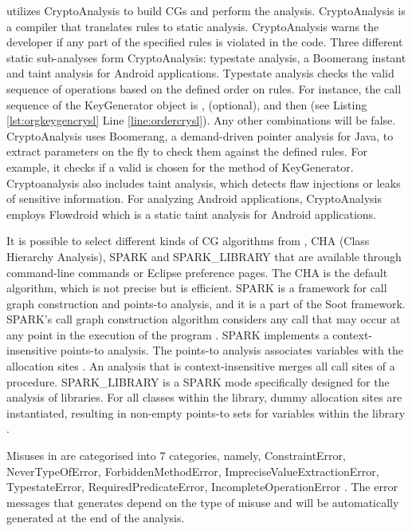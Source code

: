 \cognicryptsast{} utilizes CryptoAnalysis to build CGs and perform the analysis. CryptoAnalysis is a compiler that translates rules to static analysis. CryptoAnalysis warns the developer if any part of the specified \crysl{} rules is violated in the code. Three different static sub-analyses form CryptoAnalysis: typestate analysis, a Boomerang \cite{boomerang} instant and taint analysis for Android applications. Typestate analysis checks the valid sequence of operations based on the defined order on \crysl{} rules. For instance, the call sequence of the KeyGenerator object is ,  (optional), and then  (see Listing \ref{lst:orgkeygencrysl} Line \ref{line:ordercrysl}). Any other combinations will be false. CryptoAnalysis uses Boomerang, a demand-driven pointer analysis for Java, to extract parameters on the fly to check them against the defined \crysl{} rules. For example, it checks if a valid  is chosen for the  method of KeyGenerator.
Cryptoanalysis also includes taint analysis, which detects flaw injections or leaks of sensitive information. For analyzing Android applications, CryptoAnalysis employs Flowdroid \cite{flowdroid} which is a static taint analysis for Android applications.

It is possible to select different kinds of CG algorithms from \cognicryptsast, CHA (Class Hierarchy Analysis), SPARK \cite{spark} and SPARK\_LIBRARY that are available through command-line commands or Eclipse preference pages. The CHA is the default algorithm, which is not precise but is efficient. SPARK is a framework for call graph construction and points-to analysis, and it is a part of the Soot framework. SPARK's call graph construction algorithm considers any call that may occur at any point in the execution of the program \cite{soot}. SPARK implements a context-insensitive points-to analysis. The points-to analysis associates variables with the allocation sites \cite{pointer}. An analysis that is context-insensitive merges all call sites of a procedure.
SPARK\_LIBRARY is a SPARK mode specifically designed for the analysis of libraries. For all classes within the library, dummy allocation sites are instantiated, resulting in non-empty points-to sets for variables within the library \cite{johannesphd}. 

Misuses in \cognicryptsast{} are categorised into 7 categories, namely, ConstraintError, NeverTypeOfError, ForbiddenMethodError, ImpreciseValueExtractionError, TypestateError, RequiredPredicateError, IncompleteOperationError \cite{cryptoanalysis}. The error messages that \cognicryptsast{} generates depend on the type of misuse and will be automatically generated at the end of the analysis.